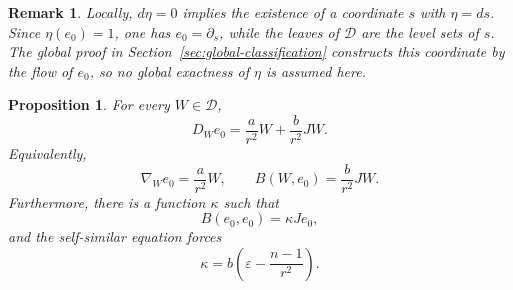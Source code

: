 \documentclass[11pt,a4paper]{article}
\numberwithin{equation}{section}
\newtheorem{proposition}[theorem]{Proposition}
\newtheorem{remark}[theorem]{Remark}
\newcommand{\Dcal}{\mathcal D}
\begin{document}
\begin{remark}
Locally, $d\eta=0$ implies the existence of a coordinate $s$ with $\eta=ds$.  Since $\eta(e_0)=1$, one has $e_0=\partial_s$, while the leaves of $\Dcal$ are the level sets of $s$.  The global proof in Section~\ref{sec:global-classification} constructs this coordinate by the flow of $e_0$, so no global exactness of $\eta$ is assumed here.
\end{remark}


\begin{proposition}
For every $W\in\Dcal$,
\begin{equation}\label{eq:D-W-e0}
        D_We_0
        =\frac{a}{r^2}W+\frac{b}{r^2}JW.
\end{equation}
Equivalently,
\begin{equation}\label{eq:nabla-B-W-e0}
        \nabla_We_0=\frac{a}{r^2}W,
        \qquad
        B(W,e_0)=\frac{b}{r^2}JW.
\end{equation}
Furthermore, there is a function $\kappa$ such that
\begin{equation}\label{eq:B-e0-e0-kappa}
        B(e_0,e_0)=\kappa Je_0,
\end{equation}
and the self-similar equation forces
\begin{equation}\label{eq:kappa-formula}
        \kappa=b\left(\varepsilon-\frac{n-1}{r^2}\right).
\end{equation}
\end{proposition}
\end{document}
